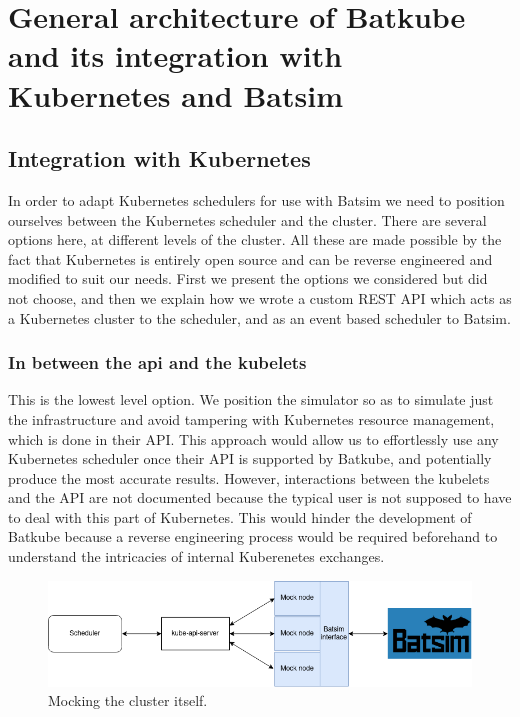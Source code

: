 \section{General architecture of Batkube and its integration with Kubernetes and Batsim}

\subsection{Integration with Kubernetes}

In order to adapt Kubernetes schedulers for use with Batsim we need to position
ourselves between the Kubernetes scheduler and the cluster. There are several
options here, at different levels of the cluster. All these are made possible
by the fact that Kubernetes is entirely open source and can be reverse
engineered and modified to suit our needs. First we present the options we
considered but did not choose, and then we explain how we wrote a custom REST
API which acts as a Kubernetes cluster to the scheduler, and as an event based
scheduler to Batsim.

\subsubsection{In between the api and the kubelets}

This is the lowest level option. We position the simulator so as to simulate
just the infrastructure and avoid tampering with Kubernetes resource
management, which is done in their API. This approach would allow us to
effortlessly use any Kubernetes scheduler once their API is supported by
Batkube, and potentially produce the most accurate results. However,
interactions between the kubelets and the API are not documented because the
typical user is not supposed to have to deal with this part of Kubernetes. This
would hinder the development of Batkube because a reverse engineering process
would be required beforehand to understand the intricacies of internal
Kuberenetes exchanges.

\begin{figure}[h]
	\centering
	\includegraphics[width=\textwidth]{imgs/architecture-as-kubelets.png}
	\caption{Mocking the cluster itself.}
	\label{fig:mock_nodes}
\end{figure}

